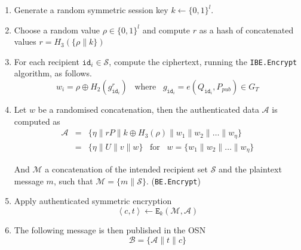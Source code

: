 \documentclass{llncs}
\newcommand{\id}[1]{\ensuremath{\mathtt{id}_{#1}}}
\begin{document}
\begin{description}
    \begin{enumerate}
        \item Generate a random symmetric session key $k \leftarrow \{ 0,1 \}^{l}$.
        \item Choose a random value $\rho \in \{ 0,1 \}^{l}$ and compute $r$ as a hash of concatenated values $r = H_3 \left( \{ \rho \parallel k \} \right)$
        \item For each recipient $\id{i} \in \mathcal{S}$, compute the ciphertext, running the \texttt{IBE.Encrypt} algorithm, as follows.
            \begin{equation*}
                w_i = \rho \oplus H_2 \left( g_{\id{i}}^r \right) \; \; \; \textrm{where} \; \; \; g_{\id{i}} = e \left( Q_{\id{i}}, P_{pub} \right) \in G_T
            \end{equation*}
        \item Let $w$ be a randomised concatenation, then the authenticated data $\mathcal{A}$ is computed as                                  
        \begin{equation*}
                \begin{array}{lcl}
                    \mathcal{A} & = & \{ \eta \parallel rP \parallel k \oplus H_3 \left( \rho \right) \parallel w_1 \parallel w_2 \parallel \ldots \parallel w_\eta \} \\
                    & = & \{ \eta \parallel U \parallel v \parallel w \} \; \; \; \textrm{for} \; \; \; w = \{ w_1 \parallel w_2 \parallel \ldots \parallel w_\eta \}
                \end{array} 
            \end{equation*}
            
        And $\mathcal{M}$ a concatenation of the intended recipient set $\mathcal{S}$ and the plaintext message $m$, such that $\mathcal{M} = \{ m \parallel \mathcal{S} \}$. (\texttt{BE.Encrypt})
    
        \item Apply authenticated symmetric encryption
        \begin{equation*}
            \left< c, t \right> \leftarrow \mathtt{E}_k(\mathcal{M},\mathcal{A})
        \end{equation*}
        \item The following message is then published in the OSN
        \begin{equation*}
            \mathcal{B} = \{ \mathcal{A} \parallel t \parallel c \}
        \end{equation*}
    \end{enumerate}
    

\end{description}
\end{document}
